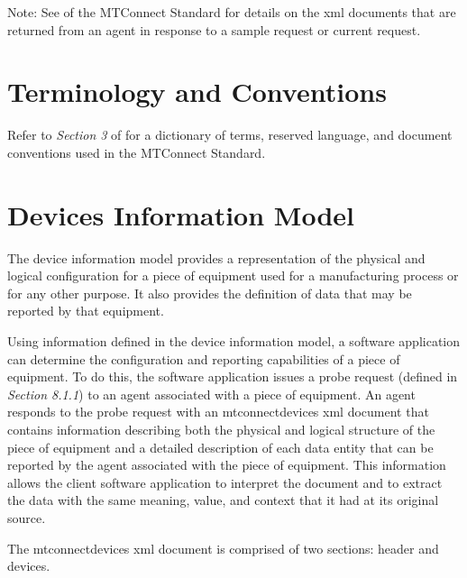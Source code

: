 \documentclass{mtconnect}	%
\begin{document}
\begin{note}
Note: See  of the MTConnect Standard for details on the \gls{xml} documents that are returned from an \gls{agent} in response to a \gls{sample request} or \gls{current request}.

\end{note}

\section{Terminology and Conventions}
Refer to \textit{Section 3} of  for a dictionary of terms, reserved language, and document conventions used in the MTConnect Standard.

\printglossary

\printacronyms  

\printbibliography[title=MTConnect References,keyword=MTC]

\printbibliography[title=Other References,notkeyword=MTC]

\section{Devices Information Model} 
\label{devices-information-model}

The \gls{device information model} provides a representation of the physical and logical configuration for a piece of equipment used for a manufacturing process or for any other purpose.  It also provides the definition of data that may be reported by that equipment. 

Using information defined in the \gls{device information model}, a software application can determine the configuration and reporting capabilities of a piece of equipment.  To do this, the software application issues a \gls{probe request} (defined in  \textit{Section 8.1.1}) to an \gls{agent} associated with a piece of equipment. An \gls{agent} responds to the \gls{probe request} with an \gls{mtconnectdevices} \gls{xml} document that contains information describing both the physical and logical structure of the piece of equipment and a detailed description of each \gls{data entity} that can be reported by the \gls{agent} associated with the piece of equipment.   This information allows the client software application to interpret the document and to extract the data with the same meaning, value, and context that it had at its original source.  

The \gls{mtconnectdevices} \gls{xml} document is comprised of two sections: \gls{header} and \gls{devices}.
\end{document}
